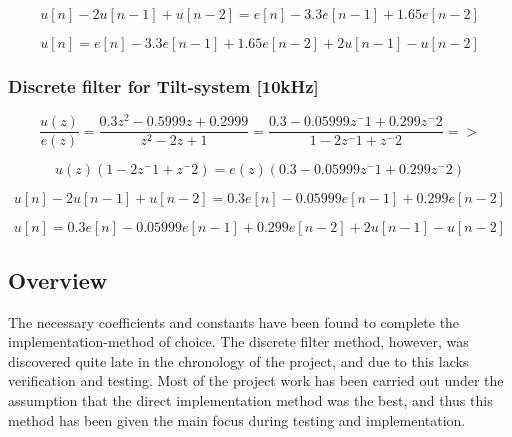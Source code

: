 \begin{equation}
u[n]-2u[n-1]+u[n-2]=e[n]-3.3e[n-1]+1.65e[n-2]
\end{equation}

\begin{equation}
u[n]=e[n]-3.3e[n-1]+1.65e[n-2]+2u[n-1]-u[n-2]
\end{equation}

\subsubsection{Discrete filter for Tilt-system [10kHz]}

\begin{equation}
\frac{u(z)}{e(z)}=\frac{0.3z^2-0.5999z+0.2999}{z^2-2z+1}=\frac{0.3-0.05999z^-1+0.299z^-2}{1-2z^-1+z^-2} =>
\end{equation}

\begin{equation}
u(z)(1-2z^-1+z^-2)=e(z)(0.3-0.05999z^-1+0.299z^-2)
\end{equation}

\begin{equation}
u[n]-2u[n-1]+u[n-2]=0.3e[n]-0.05999e[n-1]+0.299e[n-2]
\end{equation}

\begin{equation}
u[n]=0.3e[n]-0.05999e[n-1]+0.299e[n-2]+2u[n-1]-u[n-2]
\end{equation}

\subsection{Overview}
The necessary coefficients and constants have been found to complete the implementation-method of choice. The discrete filter method, however, was discovered quite late in the chronology of the project, and due to this lacks verification and testing. Most of the project work has been carried out under the assumption that the direct implementation method was the best, and thus this method has been given the main focus during testing and implementation.